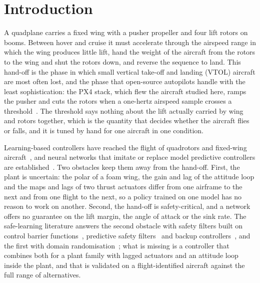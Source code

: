 \section{Introduction}\label{sec:intro}
A quadplane carries a fixed wing with a pusher propeller and four lift rotors on booms. Between hover and cruise it must accelerate through the airspeed range in which the wing produces little lift, hand the weight of the aircraft from the rotors to the wing and shut the rotors down, and reverse the sequence to land. This hand-off is the phase in which small vertical take-off and landing (VTOL) aircraft are most often lost, and the phase that open-source autopilots handle with the least sophistication: the PX4 stack, which flew the aircraft studied here, ramps the pusher and cuts the rotors when a one-hertz airspeed sample crosses a threshold~\cite{Meier2015,PX4docs}. The threshold says nothing about the lift actually carried by wing and rotors together, which is the quantity that decides whether the aircraft flies or falls, and it is tuned by hand for one aircraft in one condition.

Learning-based controllers have reached the flight of quadrotors and fixed-wing aircraft~\cite{Kaufmann2023,Song2023}, and neural networks that imitate or replace model predictive controllers are established~\cite{Hertneck2018,Karg2020,Chen2018}. Two obstacles keep them away from the hand-off. First, the plant is uncertain: the polar of a foam wing, the gain and lag of the attitude loop and the maps and lags of two thrust actuators differ from one airframe to the next and from one flight to the next, so a policy trained on one model has no reason to work on another. Second, the hand-off is safety-critical, and a network offers no guarantee on the lift margin, the angle of attack or the sink rate. The safe-learning literature answers the second obstacle with safety filters built on control barrier functions~\cite{Ames2019}, predictive safety filters~\cite{Wabersich2021} and backup controllers~\cite{Gurriet2020}, and the first with domain randomisation~\cite{Tobin2017,Peng2018}; what is missing is a controller that combines both for a plant family with lagged actuators and an attitude loop inside the plant, and that is validated on a flight-identified aircraft against the full range of alternatives.


